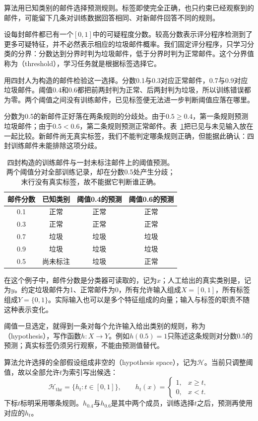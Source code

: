 算法用已知类别的邮件选择预测规则。标签即使完全正确，也只约束已经观察到的邮件，可能留下几条对训练数据回答相同、对新邮件回答不同的规则。

设每封邮件都已有一个$[0,1]$中的可疑程度分数。较高分数表示评分程序检测到了更多可疑特征，并不必然表示相应的垃圾邮件概率。我们固定评分程序，只学习分类的分界：分数达到分界时判为垃圾邮件，低于分界时判为正常邮件。这个分界值称为（threshold），学习任务就是根据标签选择它。

用四封人为构造的邮件检验这一选择。分数0.1与0.3对应正常邮件，0.7与0.9对应垃圾邮件。阈值0.4和0.6都把前两封判为正常、后两封判为垃圾，所以训练错误都为零。两个阈值之间没有训练邮件，已见标签便无法进一步判断阈值应落在哪里。

分数为0.5的新邮件正好落在两条规则的分歧处。由于$0.5\geq0.4$，第一条规则预测垃圾邮件；由于$0.5<0.6$，第二条规则预测正常邮件。表~\ref{tab:threshold-email-decisions}把已见与未见输入放在一起比较。新邮件尚无真实标签，我们不能判定哪条规则正确，但能据此确认：四封训练邮件未能排除这项分歧。

\begin{table}[htbp]
 \centering
 \begin{tabular}{cccc}
  \toprule
  邮件分数 & 已知类别 & 阈值0.4的预测 & 阈值0.6的预测\\
  \midrule
  0.1 & 正常 & 正常 & 正常\\
  0.3 & 正常 & 正常 & 正常\\
  0.7 & 垃圾 & 垃圾 & 垃圾\\
  0.9 & 垃圾 & 垃圾 & 垃圾\\
  \midrule
  0.5 & 尚未标注 & 垃圾 & 正常\\
  \bottomrule
 \end{tabular}
 \caption{四封构造的训练邮件与一封未标注邮件上的阈值预测。两个阈值分对全部训练记录，却在分数0.5处产生分歧；末行没有真实标签，故不能据它判断谁正确。}
 \label{tab:threshold-email-decisions}
\end{table}

在这个例子中，邮件分数是分类器可读取的，记为$x$；人工给出的真实类别是，记为$y$。约定垃圾邮件为1、正常邮件为0，所有允许输入组成$X=[0,1]$，所有标签组成$Y=\{0,1\}$。实际输入也可以是多个特征组成的向量；输入与标签的职责不随这种表示变化。

阈值一旦选定，就得到一条对每个允许输入给出类别的规则，称为（hypothesis），写作函数$h:X\to Y$。例如$h(0.5)=1$只陈述这条规则对分数0.5的预测；真实标签仍须另行观察，不能由预测值替代。

算法允许选择的全部假设组成非空的（hypothesis space），记为$\mathcal H$。当前只调整阈值，故以全部允许$t$为索引写出候选：
\begin{equation}
 \mathcal H_{\mathrm{thr}}=\{h_t:t\in[0,1]\},\qquad
 h_t(x)=\begin{cases}
  1,&x\geq t,\\
  0,&x<t.
 \end{cases}
 \label{eq:threshold-hypothesis-class}
\end{equation}
下标$t$标明采用哪条规则。$h_{0.4}$与$h_{0.6}$是其中两个成员，训练选择$t$之后，预测再使用对应的$h_t$。

